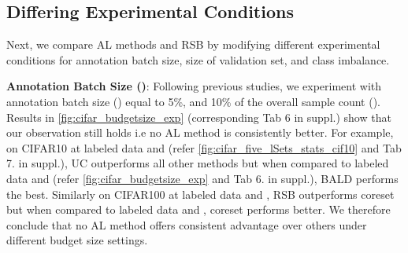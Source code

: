 \documentclass[10pt,twocolumn,letterpaper]{article}
\begin{document}
\subsection{Differing Experimental Conditions}

Next, we compare AL methods and RSB by modifying different experimental conditions for annotation batch size, size of validation set, and class imbalance.

\noindent \textbf{Annotation Batch Size ()}: Following previous studies, we experiment with annotation batch size () equal to 5\%, and 10\% of the overall sample count (). Results in \cref{fig:cifar_budgetsize_exp} (corresponding Tab 6 in suppl.) show that our observation still holds i.e no AL method is consistently better. For example, on CIFAR10 at  labeled data and  (refer \cref{fig:cifar_five_lSets_stats_cif10} and Tab 7. in suppl.), UC outperforms all other methods but when compared to  labeled data and  (refer \cref{fig:cifar_budgetsize_exp} and Tab 6. in suppl.), BALD performs the best. Similarly on CIFAR100 at  labeled data and , RSB outperforms coreset but when compared to  labeled data and , coreset performs better. We therefore conclude that no AL method offers consistent advantage over others under different budget size settings.
\end{document}

